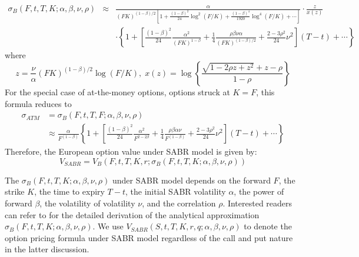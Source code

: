 \documentclass[letterpaper,12pt,titlepage,oneside,final]{book}
\numberwithin{equation}{section}
\theoremstyle{definition}
\begin{document}
\begin{eqnarray*}
	\sigma_{B}(F,t,T,K;\alpha,\beta,\nu,\rho) &\approx&
	\frac{\alpha}{(FK)^{(1-\beta)/2}\left[1+\frac{(1-\beta)^2}{24}\log^2(F/K)
		+ \frac{(1-\beta)^4}{1920}\log^4(F/K) + \cdots\right]} \cdot
	\frac{z}{x(z)}  \\
	& & \cdot \left\{1+\left[\frac{(1-\beta)^2}{24}\frac{\alpha^2}{(FK)^{1-\beta}}
	+ \frac{1}{4} \frac{\rho\beta\nu\alpha}{(FK)^{(1-\beta)/2}} +
	\frac{2-3\rho^2}{24}\nu^2 \right](T-t)+\cdots\right\}
\end{eqnarray*}
where
\[
z = \frac{\nu}{\alpha}(FK)^{(1-\beta)/2}\log (F/K),\; x(z) =
\log\left\{\frac{\sqrt{1-2\rho z + z^2}+z-\rho}{1-\rho}\right\}
\]
For the special case of at-the-money options, options struck at $K=F$,
this formula reduces to
\[
\begin{split}
\sigma_{ATM} &= \sigma_{B}(F,t,T,F;\alpha,\beta,\nu,\rho) \\
&\approx
\frac{\alpha}{F^{(1-\beta)}}\left\{1 +
\left[\frac{(1-\beta)^2}{24}\frac{\alpha^2}{F^{2-2\beta}} +
\frac{1}{4}\frac{\rho\beta\alpha\nu}{F^{(1-\beta)}} +
\frac{2-3\rho^2}{24}\nu^2 \right] (T-t) + \cdots \right\}
\end{split}
\]
Therefore, the European option value under SABR model is given by:
\[
V_{SABR}=V_B(F,t,T,K,r;\sigma_{B}(F,t,T,K;\alpha,\beta,\nu,\rho))
\]

The $\sigma_{B}(F,t,T,K;\alpha,\beta,\nu,\rho)$ under SABR model depends on the forward $F$, the strike $K$, the time to expiry $T-t$, the initial SABR volatility $\alpha$, the power of forward $\beta$, the volatility of volatility $\nu$, and the correlation $\rho$.  Interested readers can refer to \cite{hagan2002managing} for the detailed derivation of the analytical approximation $\sigma_{B}(F,t,T,K;\alpha,\beta,\nu,\rho)$.  We use $V_{SABR}(S,t,T,K,r,q;\alpha,\beta,\nu,\rho)$ to denote the option pricing formula under SABR model regardless of the call and put nature in the latter discussion.
\end{document}
